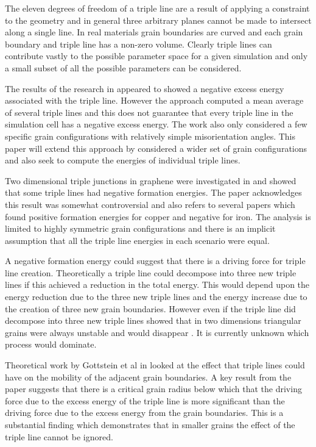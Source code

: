 \documentclass[12pt,a4paper,openany]{report}
\begin{document}
The eleven degrees of freedom of a triple line are a result of applying a constraint to the geometry and in general three arbitrary planes cannot be made to intersect along a single line.  In real materials grain boundaries are curved and each grain boundary and triple line has a non-zero volume. Clearly triple lines can contribute vastly to the possible parameter space for a given simulation and only a small subset of all the possible parameters can be considered.

The results of the research in \cite{Srinivasan1999} appeared to showed a negative excess energy associated with the triple line. However the approach computed a mean average of several triple lines and this does not guarantee that every triple line in the simulation cell has a negative excess energy. The work also only considered a few specific grain configurations with relatively simple misorientation angles. This paper will extend this approach by considered a wider set of grain configurations and also seek to compute the energies of individual triple lines.

Two dimensional triple junctions in graphene were  investigated in \citep{Hirvonen2017} and showed that some triple lines had negative formation energies. The paper acknowledges this result was somewhat controversial and also refers to several papers which found positive formation energies for copper and negative for iron. The analysis is limited to highly symmetric grain configurations and there is an implicit assumption that all the triple line energies in each scenario were equal.

A negative formation energy could suggest that there is a driving force for triple line creation. Theoretically a triple line could decompose into three new triple lines if this achieved a reduction in the total energy. This would depend upon the energy reduction due to the three new triple lines and the energy increase due to the creation of three new grain boundaries. However even if the triple line did decompose into three new triple lines \citeauthor{Shvindlerman2005} showed that in two dimensions triangular grains were always unstable and would disappear \cite{Shvindlerman2005}. It is currently unknown which process would dominate. 

Theoretical work by Gottstein et al in \cite{GOTTSTEIN2010914} looked at the effect that triple lines could have on the mobility of the adjacent grain boundaries. A key result from the paper suggests that there is a critical grain radius below which that the driving force due to the excess energy of the triple line is more significant than the driving force due to the excess energy from the grain boundaries. This is a substantial finding which demonstrates that in smaller grains the effect of the triple line cannot be ignored. 
 
\end{document}
